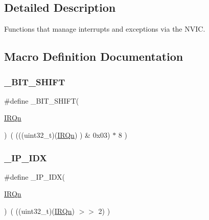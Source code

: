 \subsection{Detailed Description}
Functions that manage interrupts and exceptions via the N\+V\+IC. 



\subsection{Macro Definition Documentation}
\mbox{\label{group___c_m_s_i_s___core___n_v_i_c_functions_ga53c75b28823441c6153269f0ecbed878}} 
\subsubsection{\texorpdfstring{\_BIT\_SHIFT}{\_BIT\_SHIFT}}
{\footnotesize\ttfamily \#define \+\_\+\+B\+I\+T\+\_\+\+S\+H\+I\+FT(\begin{DoxyParamCaption}\item[{}]{\mbox{\hyperlink{group___s_a_m_d21_e15_a__cmsis_ga666eb0caeb12ec0e281415592ae89083}{I\+R\+Qn}} }\end{DoxyParamCaption})~(  (((uint32\+\_\+t)(\mbox{\hyperlink{group___s_a_m_d21_e15_a__cmsis_ga666eb0caeb12ec0e281415592ae89083}{I\+R\+Qn}})       )    \&  0x03) $\ast$ 8 )}

\mbox{\label{group___c_m_s_i_s___core___n_v_i_c_functions_ga370ec4b1751a6a889d849747df3763a9}} 
\subsubsection{\texorpdfstring{\_IP\_IDX}{\_IP\_IDX}}
{\footnotesize\ttfamily \#define \+\_\+\+I\+P\+\_\+\+I\+DX(\begin{DoxyParamCaption}\item[{}]{\mbox{\hyperlink{group___s_a_m_d21_e15_a__cmsis_ga666eb0caeb12ec0e281415592ae89083}{I\+R\+Qn}} }\end{DoxyParamCaption})~(   ((uint32\+\_\+t)(\mbox{\hyperlink{group___s_a_m_d21_e15_a__cmsis_ga666eb0caeb12ec0e281415592ae89083}{I\+R\+Qn}})            $>$$>$    2)     )}

